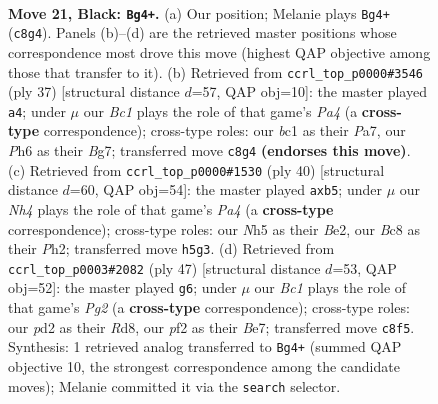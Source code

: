 \documentclass[11pt]{article}
\begin{document}
\clearpage

\begin{figure}[p]\centering
\begin{subfigure}{0.46\textwidth}\centering
\resizebox{\linewidth}{!}{%
\newchessgame
\chessboard[
  setfen={1rb2r2/pp4k1/6pp/2pBb2n/4p2P/N5P1/PP1PKP2/1RB1R3 b - - 1 21},
  showmover=false,
  pgfstyle=straightmove, color=movearrow, markmove={c8-g4}
]}
\caption{}
\end{subfigure}\hfill
\begin{subfigure}{0.46\textwidth}\centering
\resizebox{\linewidth}{!}{%
\newchessgame
\chessboard[
  setfen={r5k1/p1B1ppbp/2b2np1/p7/2P5/1P4N1/P2rBPPP/R3R1K1 b - - 0 19},
  showmover=false,
  pgfstyle=straightmove, color=movearrow, markmove={a5-a4}
]}
\caption{}
\end{subfigure}
\\[4pt]
\begin{subfigure}{0.46\textwidth}\centering
\resizebox{\linewidth}{!}{%
\newchessgame
\chessboard[
  setfen={r3r1k1/1b3pbp/p2Rp3/1p2n1P1/P3P3/2N1B3/1PP1B2P/2K2R2 w - - 1 21},
  showmover=false,
  pgfstyle=straightmove, color=movearrow, markmove={a4-b5}
]}
\caption{}
\end{subfigure}\hfill
\begin{subfigure}{0.46\textwidth}\centering
\resizebox{\linewidth}{!}{%
\newchessgame
\chessboard[
  setfen={2rr1k2/4bppp/p7/1pp5/1n2NP2/1P1PB2P/1PP2P2/2R1RK2 b - - 0 24},
  showmover=false,
  pgfstyle=straightmove, color=movearrow, markmove={g7-g6}
]}
\caption{}
\end{subfigure}
\caption{\textbf{Move 21, Black: \texttt{Bg4+}.} (a) Our position; Melanie plays \texttt{Bg4+} (\texttt{c8g4}). Panels (b)--(d) are the retrieved master positions whose correspondence most drove this move (highest QAP objective among those that transfer to it). (b) Retrieved from \texttt{ccrl\_top\_p0000\#3546} (ply 37) [structural distance $d$=57, QAP obj=10]: the master played \texttt{a4}; under $\mu$ our \emph{Bc1} plays the role of that game's \emph{Pa4} (a \textbf{cross-type} correspondence); cross-type roles: our \emph{b}c1 as their \emph{P}a7, our \emph{P}h6 as their \emph{B}g7; transferred move \texttt{c8g4} \textbf{(endorses this move)}. (c) Retrieved from \texttt{ccrl\_top\_p0000\#1530} (ply 40) [structural distance $d$=60, QAP obj=54]: the master played \texttt{axb5}; under $\mu$ our \emph{Nh4} plays the role of that game's \emph{Pa4} (a \textbf{cross-type} correspondence); cross-type roles: our \emph{N}h5 as their \emph{B}e2, our \emph{B}c8 as their \emph{P}h2; transferred move \texttt{h5g3}. (d) Retrieved from \texttt{ccrl\_top\_p0003\#2082} (ply 47) [structural distance $d$=53, QAP obj=52]: the master played \texttt{g6}; under $\mu$ our \emph{Bc1} plays the role of that game's \emph{Pg2} (a \textbf{cross-type} correspondence); cross-type roles: our \emph{p}d2 as their \emph{R}d8, our \emph{p}f2 as their \emph{B}e7; transferred move \texttt{c8f5}. Synthesis: 1 retrieved analog transferred to \texttt{Bg4+} (summed QAP objective 10, the strongest correspondence among the candidate moves); Melanie committed it via the \texttt{search} selector.}
\label{fig:thought-m41}
\end{figure}
\end{document}

